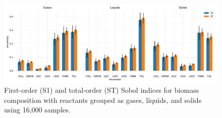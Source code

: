 \begin{figure}[H]
    \centering
    \includegraphics[width=\textwidth]{figures/sa-bar-n1000.pdf}
    \caption{First-order (S1) and total-order (ST) Sobol indices for biomass composition with reactants grouped as gases, liquids, and solids using 16,000 samples.}
\end{figure}
